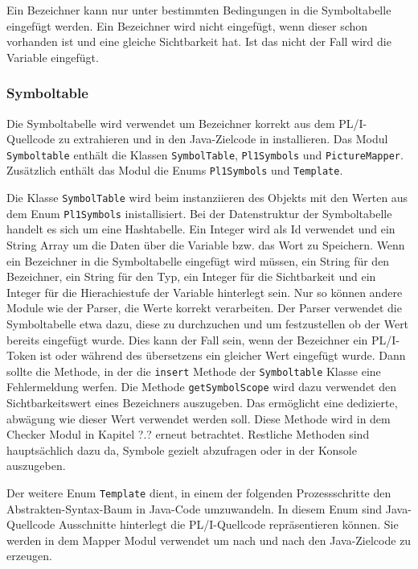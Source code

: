 Ein Bezeichner kann nur unter bestimmten Bedingungen in die Symboltabelle eingefügt werden. Ein Bezeichner wird nicht eingefügt, 
wenn dieser schon vorhanden ist und eine gleiche Sichtbarkeit hat. Ist das nicht der Fall wird die Variable eingefügt.

\subsubsection{Symboltable}
Die Symboltabelle wird verwendet um Bezeichner korrekt aus dem PL/I-Quellcode zu extrahieren und in den Java-Zielcode in installieren.
Das Modul \verb+Symboltable+ enthält die Klassen \verb+SymbolTable+, \verb+Pl1Symbols+ und \verb+PictureMapper+.
Zusätzlich enthält das Modul die Enums \verb+Pl1Symbols+ und \verb+Template+.

Die Klasse \verb+SymbolTable+ wird beim instanziieren des Objekts mit den Werten aus dem Enum \verb+Pl1Symbols+ inistallisiert. 
Bei der Datenstruktur der Symboltabelle handelt es sich um eine Hashtabelle. Ein Integer wird als Id verwendet und ein String Array um die Daten über die Variable bzw. das Wort zu Speichern. 
Wenn ein Bezeichner in die Symboltabelle eingefügt wird müssen, ein String für den Bezeichner, ein String für den Typ, ein Integer für die Sichtbarkeit und ein Integer für die Hierachiestufe der Variable hinterlegt sein. Nur so können andere Module wie der Parser, die Werte korrekt verarbeiten.
Der Parser verwendet die Symboltabelle etwa dazu, diese zu durchzuchen und um festzustellen ob der Wert bereits eingefügt wurde.
Dies kann der Fall sein, wenn der Bezeichner ein PL/I-Token ist oder während des übersetzens ein gleicher Wert eingefügt wurde.
Dann sollte die Methode, in der die \verb+insert+ Methode der \verb+Symboltable+ Klasse eine Fehlermeldung werfen.
Die Methode \verb+getSymbolScope+ wird dazu verwendet den Sichtbarkeitswert eines Bezeichners auszugeben. Das ermöglicht eine dedizierte,
abwägung wie dieser Wert verwendet werden soll. Diese Methode wird in dem Checker Modul in Kapitel ?.? erneut betrachtet.
Restliche Methoden sind hauptsächlich dazu da, Symbole gezielt abzufragen oder in der Konsole auszugeben.

Der weitere Enum \verb+Template+ dient, in einem der folgenden Prozessschritte den Abstrakten-Syntax-Baum in Java-Code umzuwandeln.
In diesem Enum sind Java-Quellcode Ausschnitte hinterlegt die PL/I-Quellcode repräsentieren können. Sie werden in dem Mapper Modul verwendet
um nach und nach den Java-Zielcode zu erzeugen.

